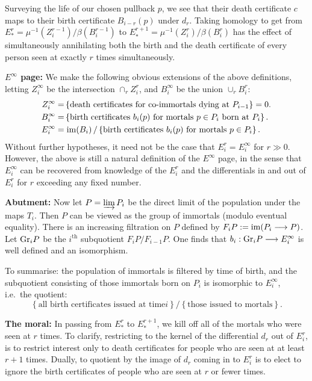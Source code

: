 \documentclass[11pt]{article}
\begin{document}
\begin{Births Deaths and Marriages}
Surveying the life of our chosen pullback $p$, we see that their death
certificate $c$ maps to their birth certificate $B_{i-r}(p)$ under $d_r$. Taking
homology to get from $E_*^r=\mu^{-1}(Z_{i}^{r-1})/\beta(B_{i}^{r-1})$ to
$E_*^{r+1}=\mu^{-1}(Z_{i}^{r})/\beta(B_{i}^{r})$ has the effect of
simultaneously annihilating both the birth and the death certificate of every
person seen at exactly $r$ times simultaneously.

\Bullet \textbf{$E^\infty$ page:} We make the following obvious extensions of
the above definitions, letting $Z^\infty_i$ be the intersection $\cap_rZ^r_i$,
and $B^\infty_i$ be the union $\cup_rB^r_i$:
\begin{alignat*}{2}
Z_{i}^\infty
=&\left\{\text{death certificates for co-immortals dying at
$P_{i-1}$}\right\}=0.\\
B_{i}^\infty=&\left\{\text{birth certificates $b_i(p)$ for mortals $p\in
 P_i$ born at $P_i$}\right\}.\\
E_{i}^{\infty}=&\left.\operatorname{im}(B_i)\,/\left\{\text{birth certificates $b_i(p)$ for
 mortals $p\in P_i$}\right\}.\right.
\end{alignat*}
Without further hypotheses, it need not be the case that $E_i^r= E_i^\infty$ for
$r\gg0$. However, the above is still a natural definition of the $E^\infty$
page, in the sense that $E^\infty_i$ can be recovered from knowledge of the
$E^r_i$ and the differentials in and out of $E^r_i$ for $r$ exceeding any fixed
number.

\Bullet \textbf{Abutment:} Now let $P=\varinjlim P_i$ be the direct limit of the
population under the maps $T_i$. Then $P$ can be viewed as the group of
immortals (modulo eventual equality). There is an increasing filtration on $P$
defined by $F_{i}P:=\operatorname{im}(P_i\longrightarrow P)$. Let $\textup{Gr}_{i}P$ be the $i^\text{th}$
subquotient $F_{i}P/F_{i-1}P$. One finds that $b_i:\textup{Gr}_iP\longrightarrow E^\infty_i$ is well
defined and an isomorphism.

To summarise: the population of immortals is filtered by time of birth, and the
subquotient consisting of those immortals born on $P_i$ is isomorphic to
$E_i^\infty$, i.e.\ the quotient:
\[\left\{\text{all birth certificates issued at time
$i$}\right\}/\left\{\text{those issued to mortals}\right\}.\]

\Bullet \textbf{The moral:} In passing from $E_*^{r}$ to $E_*^{r+1}$, we kill
off all of the mortals who were seen at $r$ times. To clarify, restricting to
the kernel of the differential $d_r$ out of $E^r_i$, is to restrict interest
only to death certificates for people who are seen at at least $r+1$ times.
Dually, to quotient by the image of $d_r$ coming in to $E^r_i$ is to elect to
ignore the birth certificates of people who are seen at $r$ or fewer times.


\end{Births Deaths and Marriages}
\end{document}
